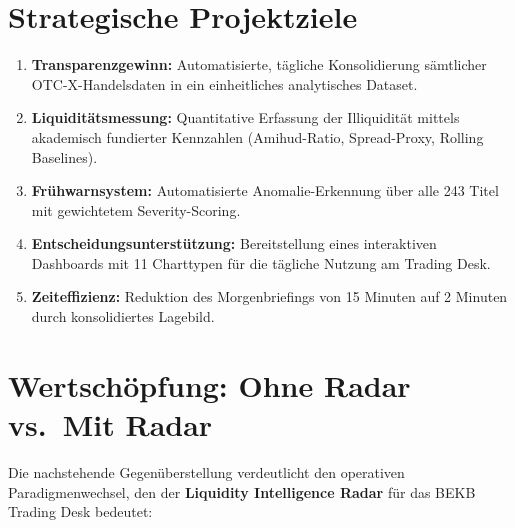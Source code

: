 \documentclass[12pt, a4paper, oneside]{report}
\newcommand{\term}[1]{\textcolor{swissred}{\textsf{\textbf{#1}}}}
\begin{document}
\section{Strategische Projektziele}

\begin{enumerate}[label=\textcolor{swissred}{\textbf{Z\arabic*.}}]
  \item \textbf{Transparenzgewinn:} Automatisierte, t\"agliche Konsolidierung s\"amtlicher OTC-X-Handelsdaten in ein einheitliches analytisches Dataset.
  \item \textbf{Liquidit\"atsmessung:} Quantitative Erfassung der Illiquidit\"at mittels akademisch fundierter Kennzahlen (Amihud-Ratio, Spread-Proxy, Rolling Baselines).
  \item \textbf{Fr\"uhwarnsystem:} Automatisierte Anomalie-Erkennung \"uber alle 243 Titel mit gewichtetem Severity-Scoring.
  \item \textbf{Entscheidungsunterst\"utzung:} Bereitstellung eines interaktiven Dashboards mit 11 Charttypen f\"ur die t\"agliche Nutzung am Trading Desk.
  \item \textbf{Zeiteffizienz:} Reduktion des Morgenbriefings von 15 Minuten auf 2 Minuten durch konsolidiertes Lagebild.
\end{enumerate}

\section{Wertsch\"opfung: Ohne Radar vs.\ Mit Radar}

Die nachstehende Gegen\"uberstellung verdeutlicht den operativen Paradigmenwechsel, den der \term{Liquidity Intelligence Radar} f\"ur das BEKB Trading Desk bedeutet:
\end{document}
